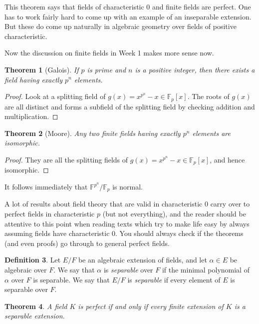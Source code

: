 \documentclass[12pt]{report}
\newtheorem{thm}{Theorem}[section]
\theoremstyle{definition}
\newtheorem{defn}[thm]{Definition}
\def\FF{\mathbb{F}}
\def\aa{\alpha}
\begin{document}
This theorem says that fields of characteristic 0 and finite fields are perfect. One has to work fairly hard to come up with an example of an inseparable extension. But these do come up naturally in algebraic geometry over fields of positive characteristic.

Now the discussion on finite fields in Week 1 makes more sense now.

\begin{thm}[Galois]
    If $p$ is prime and $n$ is a positive integer, then there exists a field having exactly $p^n$ elements.
\end{thm}

\begin{proof}
    Look at a splitting field of $g(x)=x^{p^n}-x\in \FF_p[x]$. The roots of $g(x)$ are all distinct and forms a subfield of the splitting field by checking addition and multiplication.  
\end{proof}

\begin{thm}[Moore]
    Any two finite fields having exactly $p^n$ elements are isomorphic.
\end{thm}

\begin{proof}
    They are all the splitting fields of $g(x)=x^{p^n}-x\in \FF_p[x]$, and hence isomorphic.
\end{proof}

\begin{remark}
    It follows immediately that $\FF^{p^n}/\FF_p$ is normal.
\end{remark}

A lot of results about field theory that are valid in characteristic 0 carry over to perfect fields in characteristic $p$ (but not everything), and the reader should be attentive to this point when reading texts which try to make life easy by always assuming fields have characteristic 0. You should always check if the theorems (and even proofs) go through to general perfect fields. 

\begin{defn}
    Let $E/F$ be an algebraic extension of fields, and let $\aa \in E$ be algebraic over $F$. We say that $\aa$ is \emph{separable} over $F$ if the minimal polynomial of $\aa$ over $F$ is separable. We say that $E/F$ is \emph{separable} if every element of $E$ is separable over $F$.
\end{defn}


\begin{thm}
    A field $K$ is perfect if and only if every finite extension of $K$ is a separable extension.
\end{thm}
\end{document}
